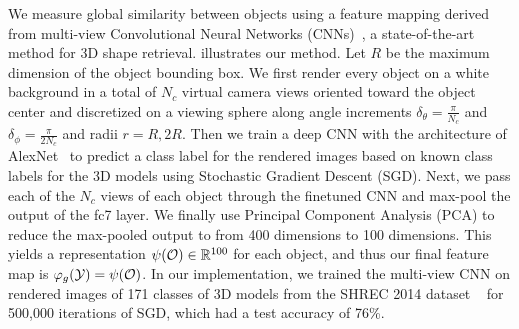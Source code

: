 We measure global similarity between objects using a feature mapping derived from multi-view Convolutional Neural Networks (CNNs)~\cite{su2015multi}, a state-of-the-art method for 3D shape retrieval.
 illustrates our method.
Let $R$ be the maximum dimension of the object bounding box.
We first render every object on a white background in a total of $N_c$ virtual camera views oriented toward the object center and discretized on a viewing sphere along angle increments $\delta_{\theta} = \frac{\pi}{N_c}$ and $\delta_{\phi} = \frac{\pi}{2 N_c}$ and radii $r = R, 2R$.
Then we train a deep CNN with the architecture of AlexNet~\cite{krizhevsky2012imagenet} to predict a class label for the rendered images based on known class labels for the 3D models using Stochastic Gradient Descent (SGD).
Next, we pass each of the $N_c$ views of each object through the finetuned CNN and max-pool the output of the fc7 layer.
We finally use Principal Component Analysis (PCA) to reduce the max-pooled output to from 400 dimensions to 100 dimensions.
This yields a representation $\psi(\mathcal{O}) \in \mathbb{R}^{100}$ for each object, and thus our final feature map is $\varphi_{g}(\mathcal{Y}) = \psi(\mathcal{O})$.
In our implementation, we trained the multi-view CNN on rendered images of 171 classes of 3D models from the SHREC 2014 dataset ~\cite{li2015comparison} for 500,000 iterations of SGD, which had a test accuracy of 76\%.


